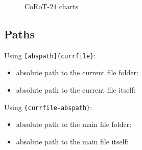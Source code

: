 \begin{figure}[ht!]
    \centering
    \begin{subfigure}
        \centering
    \end{subfigure}
    \hfill
    \begin{subfigure}
        \centering
    \end{subfigure}
    \caption{CoRoT-24 charts}
    \label{charts-corot-24}
\end{figure}

\subsection{Paths}

Using \texttt{[abspath]\{currfile\}}:

\begin{itemize}
    \item absolute path to the current file folder: \currfileabsdir
    \item absolute path to the current file itself: \currfileabspath
\end{itemize}

Using \texttt{\{currfile-abspath\}}:

\begin{itemize}
    \item absolute path to the main file folder: \mainabsdir
    \item absolute path to the main file itself: \mainabspath
\end{itemize}
